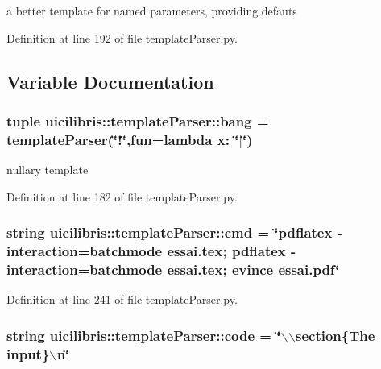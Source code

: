 a better template for named parameters, providing defauts 



\-Definition at line 192 of file template\-Parser.\-py.



\subsection{\-Variable \-Documentation}
\hypertarget{namespaceuicilibris_1_1templateParser_ae1c46ccd8cb106ed098a453a34c6485c}{
\subsubsection[{bang}]{\setlength{\rightskip}{0pt plus 5cm}tuple {\bf uicilibris\-::template\-Parser\-::bang} = {\bf template\-Parser}(\char`\"{}!\char`\"{},fun=lambda x\-: \char`\"{}$|$\char`\"{})}}\label{namespaceuicilibris_1_1templateParser_ae1c46ccd8cb106ed098a453a34c6485c}


nullary template 



\-Definition at line 182 of file template\-Parser.\-py.

\hypertarget{namespaceuicilibris_1_1templateParser_a1f824f5c36840363cddaaed894ad175e}{
\subsubsection[{cmd}]{\setlength{\rightskip}{0pt plus 5cm}string {\bf uicilibris\-::template\-Parser\-::cmd} = \char`\"{}pdflatex -\/interaction=batchmode essai.\-tex; pdflatex -\/interaction=batchmode essai.\-tex; evince essai.\-pdf\char`\"{}}}\label{namespaceuicilibris_1_1templateParser_a1f824f5c36840363cddaaed894ad175e}


\-Definition at line 241 of file template\-Parser.\-py.

\hypertarget{namespaceuicilibris_1_1templateParser_a13a85fc84f508035ebb8153b47c5f486}{
\subsubsection[{code}]{\setlength{\rightskip}{0pt plus 5cm}string {\bf uicilibris\-::template\-Parser\-::code} = \char`\"{}$\backslash$$\backslash$section\{\-The {\bf input}\}$\backslash$n\char`\"{}}}\label{namespaceuicilibris_1_1templateParser_a13a85fc84f508035ebb8153b47c5f486}


